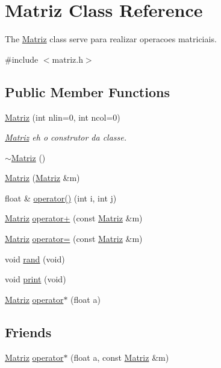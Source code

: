 \hypertarget{class_matriz}{}\section{Matriz Class Reference}
\label{class_matriz}


The \hyperlink{class_matriz}{Matriz} class serve para realizar operacoes matriciais.  




{\ttfamily \#include $<$matriz.\+h$>$}

\subsection*{Public Member Functions}
\begin{DoxyCompactItemize}
\item 
\hyperlink{class_matriz_a8f78d455cb7f0fc51b7f216cd08c67de}{Matriz} (int nlin=0, int ncol=0)
\begin{DoxyCompactList}\small\item\em \hyperlink{class_matriz}{Matriz} eh o construtor da classe. \end{DoxyCompactList}\item 
\hyperlink{class_matriz_a2092b7a289ecec369e1da407d5839f5a}{$\sim$\+Matriz} ()
\item 
\hyperlink{class_matriz_a8f3e37e196821d75d8043339fec10792}{Matriz} (\hyperlink{class_matriz}{Matriz} \&m)
\item 
float \& \hyperlink{class_matriz_a7a84e7fb199e8f55681ac1b594be7ee4}{operator()} (int i, int j)
\item 
\hyperlink{class_matriz}{Matriz} \hyperlink{class_matriz_a64b453c6c27e6189ef8661ab3d242b16}{operator+} (const \hyperlink{class_matriz}{Matriz} \&m)
\item 
\hyperlink{class_matriz}{Matriz} \hyperlink{class_matriz_ae31f04bcc48d4d514c025368b392a7b8}{operator=} (const \hyperlink{class_matriz}{Matriz} \&m)
\item 
void \hyperlink{class_matriz_a25edbf11a63be864d4beb610c621e410}{rand} (void)
\item 
void \hyperlink{class_matriz_a9928f485abd0f424546a0c80caf18372}{print} (void)
\item 
\hyperlink{class_matriz}{Matriz} \hyperlink{class_matriz_a062fee2a1bbf0478dcc7d2d16a33f813}{operator$\ast$} (float a)
\end{DoxyCompactItemize}
\subsection*{Friends}
\begin{DoxyCompactItemize}
\item 
\hyperlink{class_matriz}{Matriz} \hyperlink{class_matriz_a909d6a39e8b3be2ae33e3b9209c1b7bf}{operator$\ast$} (float a, const \hyperlink{class_matriz}{Matriz} \&m)
\end{DoxyCompactItemize}


